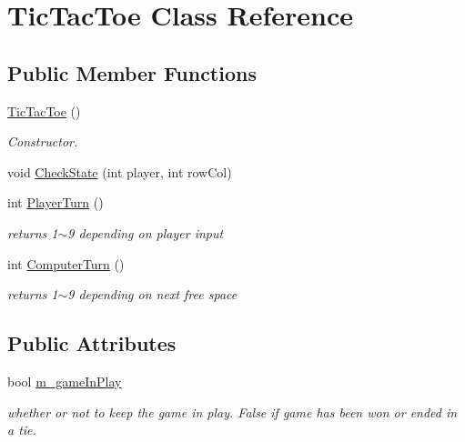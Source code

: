 \hypertarget{class_tic_tac_toe}{}\section{Tic\+Tac\+Toe Class Reference}
\label{class_tic_tac_toe}
\subsection*{Public Member Functions}
\begin{DoxyCompactItemize}
\item 
\hyperlink{class_tic_tac_toe_a103fe9a5ae41b5ef756e20594a70cb7a}{Tic\+Tac\+Toe} ()\hypertarget{class_tic_tac_toe_a103fe9a5ae41b5ef756e20594a70cb7a}{}\label{class_tic_tac_toe_a103fe9a5ae41b5ef756e20594a70cb7a}

\begin{DoxyCompactList}\small\item\em Constructor. \end{DoxyCompactList}\item 
void \hyperlink{class_tic_tac_toe_ac8d078fce31c624fe5abc82fd79761f1}{Check\+State} (int player, int row\+Col)
\item 
int \hyperlink{class_tic_tac_toe_ab0c711b7b28c84f9d8ffe1257d55e4dc}{Player\+Turn} ()
\begin{DoxyCompactList}\small\item\em returns 1$\sim$9 depending on player input \end{DoxyCompactList}\item 
int \hyperlink{class_tic_tac_toe_a5913a7ae814f50fd8b5547513c8fa7c2}{Computer\+Turn} ()
\begin{DoxyCompactList}\small\item\em returns 1$\sim$9 depending on next free space \end{DoxyCompactList}\end{DoxyCompactItemize}
\subsection*{Public Attributes}
\begin{DoxyCompactItemize}
\item 
bool \hyperlink{class_tic_tac_toe_a214158d44975ddd120192d6909332daa}{m\+\_\+game\+In\+Play}\hypertarget{class_tic_tac_toe_a214158d44975ddd120192d6909332daa}{}\label{class_tic_tac_toe_a214158d44975ddd120192d6909332daa}

\begin{DoxyCompactList}\small\item\em whether or not to keep the game in play. False if game has been won or ended in a tie. \end{DoxyCompactList}\end{DoxyCompactItemize}


